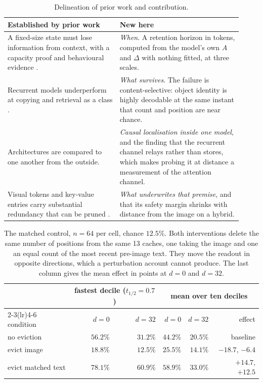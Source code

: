 \documentclass{article}
\begin{document}
\begin{table}[h]
\centering\small
\begin{tabular}{p{0.44\linewidth}p{0.48\linewidth}}
\toprule
\textbf{Established by prior work} & \textbf{New here} \\
\midrule
A fixed-size state must lose information from context, with a capacity proof
and behavioural evidence \citep{jelassi2024copying,merrill2024illusion,wen2024rnns}.
& \emph{When}. A retention horizon in tokens, computed from the model's own
$A$ and $\Delta$ with nothing fitted, at three scales. \\
\addlinespace
Recurrent models underperform at copying and retrieval as a class
\citep{arora2023zoology,arora2024based}.
& \emph{What survives}. The failure is content-selective: object identity is
highly decodable at the same instant that count and position are near chance. \\
\addlinespace
Architectures are compared to one another from the outside.
& \emph{Causal localisation inside one model}, and the finding that the
recurrent channel relays rather than stores, which makes probing it at distance
a measurement of the attention channel. \\
\addlinespace
Visual tokens and key-value entries carry substantial redundancy that can be
pruned \citep{chen2024fastv,yang2024visionzip,shang2025prumerge}.
& \emph{What underwrites that premise}, and that its safety margin shrinks
with distance from the image on a hybrid. \\
\bottomrule
\end{tabular}
\caption{Delineation of prior work and contribution.}
\label{tab:novelty}
\end{table}

\begin{table}[h]
\centering\small
\begin{tabular}{lrrrrr}
\toprule
& \multicolumn{2}{c}{fastest decile ($t_{1/2} = 0.7$)} & \multicolumn{3}{c}{mean over ten deciles} \\
\cmidrule(lr){2-3}\cmidrule(lr){4-6}
condition & $d{=}0$ & $d{=}32$ & $d{=}0$ & $d{=}32$ & effect \\
\midrule
no eviction               & $56.2\%$ & $31.2\%$ & $44.2\%$ & $20.5\%$ & baseline \\
evict image               & $18.8\%$ & $12.5\%$ & $25.5\%$ & $14.1\%$ & $-18.7$, $-6.4$ \\
evict matched text        & $78.1\%$ & $60.9\%$ & $58.9\%$ & $33.0\%$ & $+14.7$, $+12.5$ \\
\bottomrule
\end{tabular}
\caption{The matched control, $n = 64$ per cell, chance $12.5\%$. Both
interventions delete the same number of positions from the same 13 caches, one
taking the image and one an equal count of the most recent pre-image text. They
move the readout in opposite directions, which a perturbation account cannot
produce. The last column gives the mean effect in points at $d{=}0$ and
$d{=}32$.}
\label{tab:controls}
\end{table}
\end{document}
